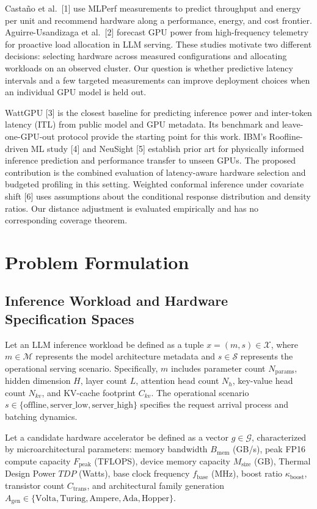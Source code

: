 \documentclass[preprint,12pt]{elsarticle}
\begin{document}
Castaño et al.~{[}1{]} use MLPerf measurements to predict throughput and
energy per unit and recommend hardware along a performance, energy, and
cost frontier. Aguirre-Usandizaga et al.~{[}2{]} forecast GPU power from
high-frequency telemetry for proactive load allocation in LLM serving.
These studies motivate two different decisions: selecting hardware
across measured configurations and allocating workloads on an observed
cluster. Our question is whether predictive latency intervals and a few
targeted measurements can improve deployment choices when an individual
GPU model is held out.

WattGPU {[}3{]} is the closest baseline for predicting inference power
and inter-token latency (ITL) from public model and GPU metadata. Its
benchmark and leave-one-GPU-out protocol provide the starting point for
this work. IBM's Roofline-driven ML study {[}4{]} and NeuSight {[}5{]}
establish prior art for physically informed inference prediction and
performance transfer to unseen GPUs. The proposed contribution is the
combined evaluation of latency-aware hardware selection and budgeted
profiling in this setting. Weighted conformal inference under covariate
shift {[}6{]} uses assumptions about the conditional response
distribution and density ratios. Our distance adjustment is evaluated
empirically and has no corresponding coverage theorem.

\section{Problem Formulation}
\label{sec:formulation}

\subsection{Inference Workload and Hardware Specification Spaces}
Let an LLM inference workload be defined as a tuple $x = (m, s) \in \mathcal{X}$, where $m \in \mathcal{M}$ represents the model architecture metadata and $s \in \mathcal{S}$ represents the operational serving scenario. Specifically, $m$ includes parameter count $N_{\text{params}}$, hidden dimension $H$, layer count $L$, attention head count $N_h$, key-value head count $N_{kv}$, and KV-cache footprint $C_{kv}$. The operational scenario $s \in \{\text{offline}, \text{server\_low}, \text{server\_high}\}$ specifies the request arrival process and batching dynamics.

Let a candidate hardware accelerator be defined as a vector $g \in \mathcal{G}$, characterized by microarchitectural parameters: memory bandwidth $B_{\text{mem}}$ (GB/s), peak FP16 compute capacity $F_{\text{peak}}$ (TFLOPS), device memory capacity $M_{\text{size}}$ (GB), Thermal Design Power $TDP$ (Watts), base clock frequency $f_{\text{base}}$ (MHz), boost ratio $\kappa_{\text{boost}}$, transistor count $C_{\text{trans}}$, and architectural family generation $A_{\text{gen}} \in \{\text{Volta}, \text{Turing}, \text{Ampere}, \text{Ada}, \text{Hopper}\}$.
\end{document}
